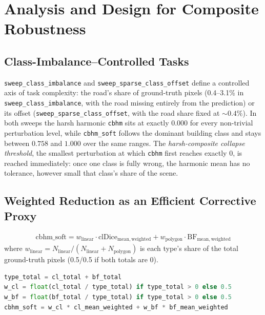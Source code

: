 \section{Analysis and Design for Composite Robustness}
\label{sec:composite}

\subsection{Class-Imbalance--Controlled Tasks}
\label{subsec:class-imbalance}

\texttt{sweep\_class\_imbalance} and \texttt{sweep\_sparse\_class\_offset} define a controlled axis
of task complexity: the road's share of ground-truth pixels (0.4--3.1\% in \texttt{sweep\_class\_imbalance}, with the road missing entirely
from the prediction) or its offset (\texttt{sweep\_sparse\_class\_offset}, with the road share
fixed at ${\sim}0.4\%$). In both sweeps the harsh harmonic \texttt{cbhm} sits at exactly $0.000$
for every non-trivial perturbation level, while \texttt{cbhm\_soft} follows the dominant building
class and stays between $0.758$ and $1.000$ over the same ranges. The \emph{harsh-composite
collapse threshold}, the smallest perturbation at which \texttt{cbhm} first reaches exactly 0, is
reached immediately: once one class is fully wrong, the harmonic mean has no tolerance, however
small that class's share of the scene.

\subsection{Weighted Reduction as an Efficient Corrective Proxy}
\label{subsec:weighted-reduction}

\begin{align}
  \mathrm{cbhm\_soft} = w_{\mathrm{linear}} \cdot \mathrm{clDice}_{\mathrm{mean,weighted}} +
                         w_{\mathrm{polygon}} \cdot \mathrm{BF}_{\mathrm{mean,weighted}}
\end{align}
where $w_{\mathrm{linear}} = N_{\mathrm{linear}} / (N_{\mathrm{linear}} + N_{\mathrm{polygon}})$
is each type's share of the total ground-truth pixels (0.5/0.5 if both totals are 0).

\begin{lstlisting}[language=Python, float=tp, caption={Type weights and \texttt{cbhm\_soft}, \texttt{metrics/unified.py:109-116}}]
type_total = cl_total + bf_total
w_cl = float(cl_total / type_total) if type_total > 0 else 0.5
w_bf = float(bf_total / type_total) if type_total > 0 else 0.5
cbhm_soft = w_cl * cl_mean_weighted + w_bf * bf_mean_weighted
\end{lstlisting}

